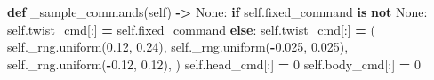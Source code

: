 \documentclass[
  chinese,
  11pt,
  letterpaper,
]{article}
\newenvironment{Shaded}{\begin{snugshade}}{\end{snugshade}}
\newcommand{\ControlFlowTok}[1]{\textcolor[rgb]{0.13,0.29,0.53}{\textbf{#1}}}
\newcommand{\DecValTok}[1]{\textcolor[rgb]{0.00,0.00,0.81}{#1}}
\newcommand{\FloatTok}[1]{\textcolor[rgb]{0.00,0.00,0.81}{#1}}
\newcommand{\KeywordTok}[1]{\textcolor[rgb]{0.13,0.29,0.53}{\textbf{#1}}}
\newcommand{\NormalTok}[1]{#1}
\newcommand{\OperatorTok}[1]{\textcolor[rgb]{0.81,0.36,0.00}{\textbf{#1}}}
\newcommand{\VariableTok}[1]{\textcolor[rgb]{0.00,0.00,0.00}{#1}}
\renewenvironment{Shaded}{\par\smallskip}{\par\smallskip}
\begin{document}
\begin{Shaded}
\begin{Highlighting}[]
    \KeywordTok{def}\NormalTok{ \_sample\_commands(}\VariableTok{self}\NormalTok{) }\OperatorTok{{-}\textgreater{}} \VariableTok{None}\NormalTok{:}
        \ControlFlowTok{if} \VariableTok{self}\NormalTok{.fixed\_command }\KeywordTok{is} \KeywordTok{not} \VariableTok{None}\NormalTok{:}
            \VariableTok{self}\NormalTok{.twist\_cmd[:] }\OperatorTok{=} \VariableTok{self}\NormalTok{.fixed\_command}
        \ControlFlowTok{else}\NormalTok{:}
            \VariableTok{self}\NormalTok{.twist\_cmd[:] }\OperatorTok{=}\NormalTok{ (}
                \VariableTok{self}\NormalTok{.\_rng.uniform(}\FloatTok{0.12}\NormalTok{, }\FloatTok{0.24}\NormalTok{),}
                \VariableTok{self}\NormalTok{.\_rng.uniform(}\OperatorTok{{-}}\FloatTok{0.025}\NormalTok{, }\FloatTok{0.025}\NormalTok{),}
                \VariableTok{self}\NormalTok{.\_rng.uniform(}\OperatorTok{{-}}\FloatTok{0.12}\NormalTok{, }\FloatTok{0.12}\NormalTok{),}
\NormalTok{            )}
        \VariableTok{self}\NormalTok{.head\_cmd[:] }\OperatorTok{=} \DecValTok{0}
        \VariableTok{self}\NormalTok{.body\_cmd[:] }\OperatorTok{=} \DecValTok{0}


\end{Highlighting}
\end{Shaded}
\end{document}
